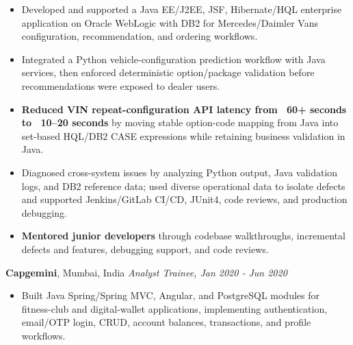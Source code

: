 \documentclass[11pt,letterpaper]{article}
\begin{document}
\begin{itemize}
  \item Developed and supported a Java EE/J2EE, JSF, Hibernate/HQL enterprise application on Oracle WebLogic with DB2 for Mercedes/Daimler Vans configuration, recommendation, and ordering workflows.
  \item Integrated a Python vehicle-configuration prediction workflow with Java services, then enforced deterministic option/package validation before recommendations were exposed to dealer users.
  \item \textbf{Reduced VIN repeat-configuration API latency from ~60+ seconds to ~10--20 seconds} by moving stable option-code mapping from Java into set-based HQL/DB2 CASE expressions while retaining business validation in Java.
  \item Diagnosed cross-system issues by analyzing Python output, Java validation logs, and DB2 reference data; used diverse operational data to isolate defects and supported Jenkins/GitLab CI/CD, JUnit4, code reviews, and production debugging.
  \item \textbf{Mentored junior developers} through codebase walkthroughs, incremental defects and features, debugging support, and code reviews.
\end{itemize}
\textbf{Capgemini}, Mumbai, India \hfill \textit{Analyst Trainee, Jan 2020 - Jun 2020}
\begin{itemize}
  \item Built Java Spring/Spring MVC, Angular, and PostgreSQL modules for fitness-club and digital-wallet applications, implementing authentication, email/OTP login, CRUD, account balances, transactions, and profile workflows.
\end{itemize}
\end{document}
